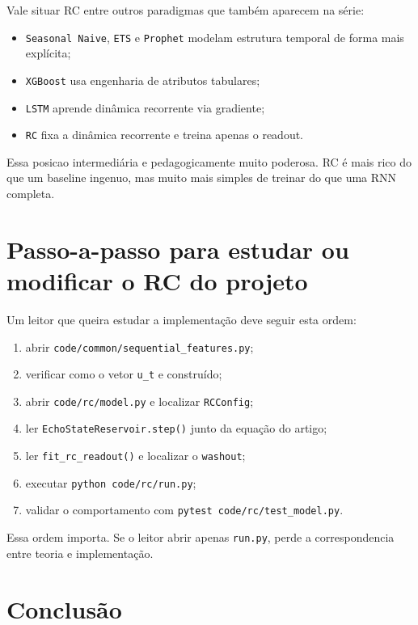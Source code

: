 \documentclass[12pt]{article}
\providecommand{\tightlist}{%
              \setlength{\itemsep}{0pt}\setlength{\parskip}{0pt}}
\begin{document}
Vale situar RC entre outros paradigmas que também aparecem na série:

\begin{itemize}
\tightlist
\item
  \texttt{Seasonal\ Naive}, \texttt{ETS} e \texttt{Prophet} modelam estrutura temporal de forma mais explícita;
\item
  \texttt{XGBoost} usa engenharia de atributos tabulares;
\item
  \texttt{LSTM} aprende dinâmica recorrente via gradiente;
\item
  \texttt{RC} fixa a dinâmica recorrente e treina apenas o readout.
\end{itemize}

Essa posicao intermediária e pedagogicamente muito poderosa. RC é mais rico do que um baseline ingenuo, mas muito mais simples de treinar do que uma RNN completa.

\section{Passo-a-passo para estudar ou modificar o RC do projeto}\label{10-passo-a-passo-para-estudar-ou-modificar-o-rc-do-projeto}

Um leitor que queira estudar a implementação deve seguir esta ordem:

\begin{enumerate}
\def\labelenumi{\arabic{enumi}.}
\tightlist
\item
  abrir \texttt{code/common/sequential\_features.py};
\item
  verificar como o vetor \texttt{u\_t} e construído;
\item
  abrir \texttt{code/rc/model.py} e localizar \texttt{RCConfig};
\item
  ler \texttt{EchoStateReservoir.step()} junto da equação do artigo;
\item
  ler \texttt{fit\_rc\_readout()} e localizar o \texttt{washout};
\item
  executar \texttt{python\ code/rc/run.py};
\item
  validar o comportamento com \texttt{pytest\ code/rc/test\_model.py}.
\end{enumerate}

Essa ordem importa. Se o leitor abrir apenas \texttt{run.py}, perde a correspondencia entre teoria e implementação.

\section{Conclusão}\label{11-conclusuxe3o}
\end{document}
